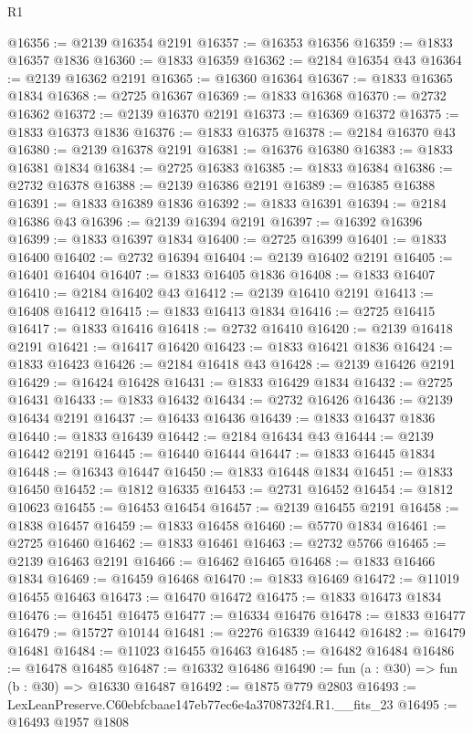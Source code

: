 \begin{lexlean}{R1}
\begin{coremodule}
@16356 := @2139 @16354 @2191
@16357 := @16353 @16356
@16359 := @1833 @16357 @1836
@16360 := @1833 @16359
@16362 := @2184 @16354 @43
@16364 := @2139 @16362 @2191
@16365 := @16360 @16364
@16367 := @1833 @16365 @1834
@16368 := @2725 @16367
@16369 := @1833 @16368
@16370 := @2732 @16362
@16372 := @2139 @16370 @2191
@16373 := @16369 @16372
@16375 := @1833 @16373 @1836
@16376 := @1833 @16375
@16378 := @2184 @16370 @43
@16380 := @2139 @16378 @2191
@16381 := @16376 @16380
@16383 := @1833 @16381 @1834
@16384 := @2725 @16383
@16385 := @1833 @16384
@16386 := @2732 @16378
@16388 := @2139 @16386 @2191
@16389 := @16385 @16388
@16391 := @1833 @16389 @1836
@16392 := @1833 @16391
@16394 := @2184 @16386 @43
@16396 := @2139 @16394 @2191
@16397 := @16392 @16396
@16399 := @1833 @16397 @1834
@16400 := @2725 @16399
@16401 := @1833 @16400
@16402 := @2732 @16394
@16404 := @2139 @16402 @2191
@16405 := @16401 @16404
@16407 := @1833 @16405 @1836
@16408 := @1833 @16407
@16410 := @2184 @16402 @43
@16412 := @2139 @16410 @2191
@16413 := @16408 @16412
@16415 := @1833 @16413 @1834
@16416 := @2725 @16415
@16417 := @1833 @16416
@16418 := @2732 @16410
@16420 := @2139 @16418 @2191
@16421 := @16417 @16420
@16423 := @1833 @16421 @1836
@16424 := @1833 @16423
@16426 := @2184 @16418 @43
@16428 := @2139 @16426 @2191
@16429 := @16424 @16428
@16431 := @1833 @16429 @1834
@16432 := @2725 @16431
@16433 := @1833 @16432
@16434 := @2732 @16426
@16436 := @2139 @16434 @2191
@16437 := @16433 @16436
@16439 := @1833 @16437 @1836
@16440 := @1833 @16439
@16442 := @2184 @16434 @43
@16444 := @2139 @16442 @2191
@16445 := @16440 @16444
@16447 := @1833 @16445 @1834
@16448 := @16343 @16447
@16450 := @1833 @16448 @1834
@16451 := @1833 @16450
@16452 := @1812 @16335
@16453 := @2731 @16452
@16454 := @1812 @10623
@16455 := @16453 @16454
@16457 := @2139 @16455 @2191
@16458 := @1838 @16457
@16459 := @1833 @16458
@16460 := @5770 @1834
@16461 := @2725 @16460
@16462 := @1833 @16461
@16463 := @2732 @5766
@16465 := @2139 @16463 @2191
@16466 := @16462 @16465
@16468 := @1833 @16466 @1834
@16469 := @16459 @16468
@16470 := @1833 @16469
@16472 := @11019 @16455 @16463
@16473 := @16470 @16472
@16475 := @1833 @16473 @1834
@16476 := @16451 @16475
@16477 := @16334 @16476
@16478 := @1833 @16477
@16479 := @15727 @10144
@16481 := @2276 @16339 @16442
@16482 := @16479 @16481
@16484 := @11023 @16455 @16463
@16485 := @16482 @16484
@16486 := @16478 @16485
@16487 := @16332 @16486
@16490 := fun (a : @30) => fun (b : @30) => @16330 @16487
@16492 := @1875 @779 @2803
@16493 := LexLeanPreserve.C60ebfcbaae147eb77ec6e4a3708732f4.R1.__fits_23
@16495 := @16493 @1957 @1808

\end{coremodule}
\end{lexlean}
